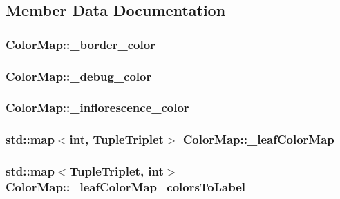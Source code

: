 \subsection{Member Data Documentation}
\hypertarget{classColorMap_ac14da2d8cff300273259beec73527823}{
\subsubsection[{\-\_\-border\-\_\-color}]{ Color\-Map\-::\-\_\-border\-\_\-color}}\label{classColorMap_ac14da2d8cff300273259beec73527823}
\hypertarget{classColorMap_afed7eeec6dcbe55ab0aefb47e90c5ce4}{
\subsubsection[{\-\_\-debug\-\_\-color}]{ Color\-Map\-::\-\_\-debug\-\_\-color}}\label{classColorMap_afed7eeec6dcbe55ab0aefb47e90c5ce4}
\hypertarget{classColorMap_a09f8cb11bf9f40129642c4ce9f453b6c}{
\subsubsection[{\-\_\-inflorescence\-\_\-color}]{ Color\-Map\-::\-\_\-inflorescence\-\_\-color}}\label{classColorMap_a09f8cb11bf9f40129642c4ce9f453b6c}
\hypertarget{classColorMap_ab9474afada1f2a6e80064c9a96257bb7}{
\subsubsection[{\-\_\-leaf\-Color\-Map}]{\setlength{\rightskip}{0pt plus 5cm}std\-::map$<$int, {\bf Tuple\-Triplet}$>$ Color\-Map\-::\-\_\-leaf\-Color\-Map}}\label{classColorMap_ab9474afada1f2a6e80064c9a96257bb7}
\hypertarget{classColorMap_ad4a0ffa302e1b5ac1cf56b8228c91c8d}{
\subsubsection[{\-\_\-leaf\-Color\-Map\-\_\-colors\-To\-Label}]{\setlength{\rightskip}{0pt plus 5cm}std\-::map$<${\bf Tuple\-Triplet}, int$>$ Color\-Map\-::\-\_\-leaf\-Color\-Map\-\_\-colors\-To\-Label}}\label{classColorMap_ad4a0ffa302e1b5ac1cf56b8228c91c8d}
